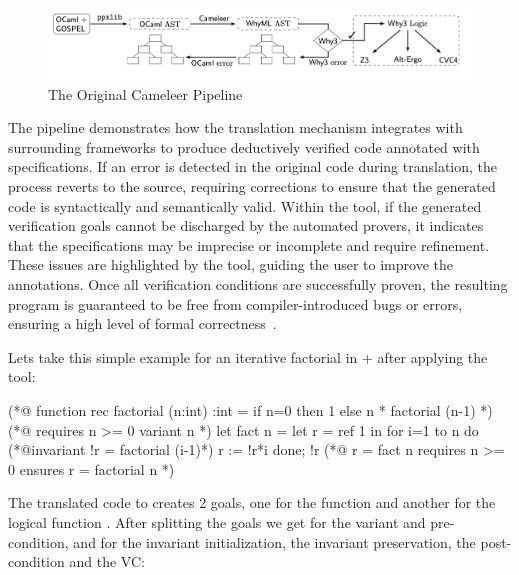 \begin{figure}[H]
    \centering
    \includegraphics[width=\linewidth]{images/Cameleer_From_Paper.png}
    \caption{The Original Cameleer Pipeline~\cite{PereiraR20}}
    \label{fig:CameleerPipeline}
\end{figure}

The pipeline demonstrates how the translation mechanism integrates with surrounding frameworks to produce deductively verified 
\ocaml code annotated with \gospel specifications. If an error is detected in the original \ocaml code during translation, the 
process reverts to the source, requiring corrections to ensure that the generated \whyml code is syntactically and semantically 
valid. Within the \whythree tool, if the generated verification goals cannot be discharged by the automated provers, it indicates 
that the specifications may be imprecise or incomplete and require refinement. These issues are highlighted by the tool, guiding the 
user to improve the annotations. Once all verification conditions are successfully proven, the resulting program is guaranteed to 
be free from compiler-introduced bugs or errors, ensuring a high level of formal correctness~\cite{Filliatre11}.

Lets take this simple example for an iterative factorial in \ocaml + \gospel after applying the \cameleer tool:

\begin{gospell}
(*@ 
  function rec factorial (n:int) :int = 
    if n=0 then 1 else n * factorial (n-1)
*)
(*@ 
  requires n >= 0
  variant n
*)
let fact n = 
  let r = ref 1 in 
    for i=1 to n do 
      (*@invariant !r = factorial (i-1)*)
      r := !r*i 
    done; 
    !r
(*@ 
  r = fact n
  requires n >= 0 
  ensures r = factorial n
*)
\end{gospell}

The translated code to \whyml creates 2 goals, one for the function  and another for the logical function
. After splitting the goals we get for  the variant and pre-condition, and for
 the invariant initialization, the invariant preservation, the post-condition and the VC:

